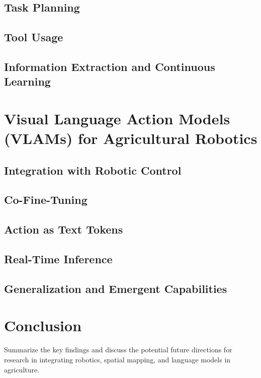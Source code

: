 \documentclass[12pt]{report}
\begin{document}
\section{Task Planning}
\section{Tool Usage}
\section{Information Extraction and Continuous Learning}

\chapter{Visual Language Action Models (VLAMs) for Agricultural Robotics}
\section{Integration with Robotic Control}
\section{Co-Fine-Tuning}
\section{Action as Text Tokens}
\section{Real-Time Inference}
\section{Generalization and Emergent Capabilities}

\chapter{Conclusion}
Summarize the key findings and discuss the potential future directions for research in integrating robotics, spatial mapping, and language models in agriculture.



\end{document}
